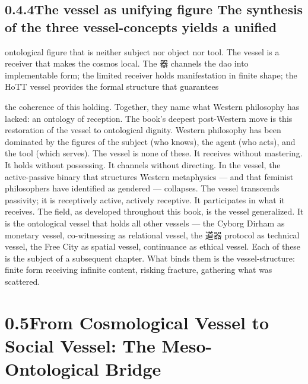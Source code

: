 \subsection{0.4.4\quad The vessel as unifying figure The synthesis of the three vessel-concepts yields a unified}

ontological figure that is neither subject nor object nor tool. The vessel is a receiver that makes the cosmos local. The 器 channels the dao into implementable form; the limited receiver holds manifestation in finite shape; the HoTT vessel provides the formal structure that guarantees

the coherence of this holding. Together, they name what Western philosophy has lacked: an ontology of reception. The book’s deepest post-Western move is this restoration of the vessel to ontological dignity. Western philosophy has been dominated by the figures of the subject (who knows), the agent (who acts), and the tool (which serves). The vessel is none of these. It receives without mastering. It holds without possessing. It channels without directing. In the vessel, the active-passive binary that structures Western metaphysics — and that feminist philosophers have identified as gendered — collapses. The vessel transcends passivity; it is receptively active, actively receptive. It participates in what it receives. The field, as developed throughout this book, is the vessel generalized. It is the ontological vessel that holds all other vessels — the Cyborg Dirham as monetary vessel, co-witnessing as relational vessel, the 道器 protocol as technical vessel, the Free City as spatial vessel, continuance as ethical vessel. Each of these is the subject of a subsequent chapter. What binds them is the vessel-structure: finite form receiving infinite content, risking fracture, gathering what was scattered.

\section{0.5\quad From Cosmological Vessel to Social Vessel: The Meso-Ontological Bridge}

